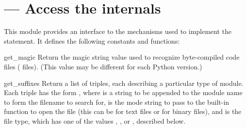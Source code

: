 \section{ ---
         Access the  internals}



This module provides an interface to the mechanisms
used to implement the  statement.  It defines the
following constants and functions:


\begin{funcdesc}{get_magic}{}
Return the magic string value used to recognize byte-compiled code
files ( files).  (This value may be different for each
Python version.)
\end{funcdesc}

\begin{funcdesc}{get_suffixes}{}
Return a list of triples, each describing a particular type of module.
Each triple has the form , where  is a string to be appended to the
module name to form the filename to search for,  is the mode
string to pass to the built-in  function to open the
file (this can be  for text files or  for binary
files), and  is the file type, which has one of the values
, , or
, described below.
\end{funcdesc}

